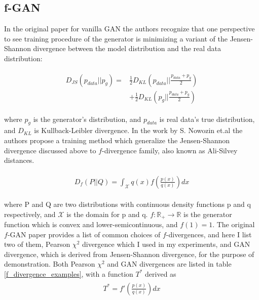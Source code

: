 \documentclass[10pt,twocolumn,letterpaper]{article}
\begin{document}
\subsection{f-GAN}
\label{f_gan}

In the original paper for vanilla GAN \cite{goodfellow2014generative} the authors recognize that one perspective to see training procedure of the generator is minimizing a variant of the Jensen-Shannon divergence between the model distribution and the real data distribution:

\begin{equation} 
\begin{split}
\begin{aligned}
D_{JS}(p_{data}||p_g) = &\frac{1}{2} D_{KL}(p_{data}||\frac{p_{data} + p_g}{2}) \\
&+ \frac{1}{2} D_{KL}(p_g||\frac{p_{data} + p_g}{2})
\end{aligned}
\end{split}
\label{d_js}
\end{equation}

where $p_g$ is the generator's distribution, and $p_{data}$ is real data's true distribution, and $D_{KL}$ is Kullback-Leibler divergence. In the work by S. Nowozin et.al \cite{nowozin2016fgan} the authors propose a training method which generalize the Jensen-Shannon divergence discussed above to $f$-divergence family, also known as Ali-Silvey distances. 

\begin{equation} 
\begin{split}
\begin{aligned}
    D_f(P||Q) = \int_{\mathcal{X}} q(x) f\left(\frac{p(x)}{q(x)}\right) dx 
\end{aligned}
\end{split}
\label{f_divergence}
\end{equation}

where P and Q are two distributions with continuous density functions p and q respectively, and $\mathcal{X}$ is the domain for p and q. $f: \mathbb{R_+} \xrightarrow{} \mathbb{R}$ is the generator function which is convex and lower-semicontinuous, and $f(1) = 1$. The original $f$-GAN paper provides a list of common choices of $f$-divergences, and here I list two of them, Pearson $\chi^2$ divergence which I used in my experiments, and GAN divergence, which is derived from Jensen-Shannon divergence, for the purpose of demonstration. Both Pearson $\chi^2$ and GAN divergences are listed in table \ref{f_divergence_examples}, with a function $T^*$ derived as 
\begin{equation} 
\begin{split}
\begin{aligned}
    T^* =  f'\left(\frac{p(x)}{q(x)}\right) dx 
\end{aligned}
\end{split}
\label{f_divergence}
\end{equation}
\end{document}
